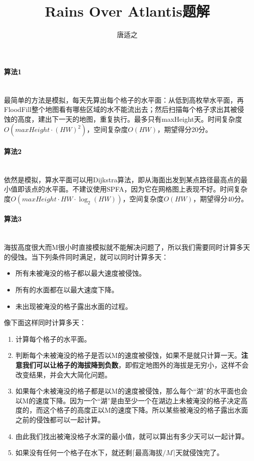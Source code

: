 \documentclass[UTF8]{ctexart}
\title{Rains Over Atlantis题解}
\author{唐适之}
\date{}
\newcommand{\myparagraph}[1]{\paragraph{#1}\mbox{}\\}
\begin{document}
	
	\maketitle
	
	\myparagraph{算法1}
		
		最简单的方法是模拟，每天先算出每个格子的水平面：从低到高枚举水平面，再FloodFill整个地图看有哪些区域的水不能流出去；然后扫描每个格子求出其被侵蚀的高度，建出下一天的地图，重复执行。最多只有maxHeight天。时间复杂度$O(maxHeight \cdot (HW)^2)$，空间复杂度$O(HW)$，期望得分20分。
		
	\myparagraph{算法2}
	
		依然是模拟，算水平面可以用Dijkstra算法，即从海面出发到某点路径最高点的最小值即该点的水平面。不建议使用SPFA，因为它在网格图上表现不好。时间复杂度$O(maxHeight \cdot HW \cdot \log_2(HW))$，空间复杂度$O(HW)$，期望得分40分。
	
	\myparagraph{算法3}
	
		海拔高度很大而M很小时直接模拟就不能解决问题了，所以我们需要同时计算多天的侵蚀。当下列条件同时满足，就可以同时计算多天：
		
		\begin{itemize}[leftmargin=15mm]
			\item 所有未被淹没的格子都以最大速度被侵蚀。
			\item 所有的水面都在以最大速度下降。
			\item 未出现被淹没的格子露出水面的过程。
		\end{itemize}
		
		像下面这样同时计算多天：
		
		\begin{enumerate}[leftmargin=15mm]
			\item 计算每个格子的水平面。
			\item 判断每个未被淹没的格子是否以M的速度被侵蚀，如果不是就只计算一天。\textbf{注意我们可以让格子的海拔降到负数}，即假定地图外的海拔是无穷小，这样不会改变结果，并会大大简化问题。
			\item 如果每个未被淹没的格子都是以M的速度被侵蚀，那么每个“湖”的水平面也会以M的速度下降。因为一个“湖”是由至少一个在湖边上未被淹没的格子决定高度的，而这个格子的高度正以M的速度下降。所以某些被淹没的格子露出水面之前的侵蚀都可以一起计算。
			\item 由此我们找出被淹没格子水深的最小值，就可以算出有多少天可以一起计算。
			\item 如果没有任何一个格子在水下，就还剩$\lceil \mbox{最高海拔}/M \rceil$天就侵蚀完了。
		\end{enumerate}
		
\end{document}
